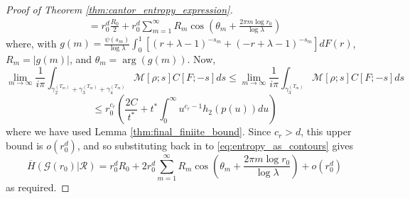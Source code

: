 \documentclass{article}
\newcommand{\tti}{\rightarrow\infty}
\newcommand{\graph}{\mathcal{G}}
\begin{document}
\begin{proof}[Proof of Theorem \ref{thm:cantor_entropy_expression}]
\begin{align}
        = r_0^d \frac{R_0}{2} + r_0^d\sum_{m=1}^{\infty} R_m\cos\left(\theta_m + \frac{2\pi m \log r_0}{\log \lambda}\right)
    \end{align}
    where, with $g(m) = \frac{\psi(s_m)}{\log \lambda}\int_0^1\left[(r+\lambda-1)^{-s_m}+(-r+\lambda-1)^{-s_m}\right]dF(r)$, $R_m = |g(m)|$, and $\theta_m = \arg(g(m))$. Now, 
    \begin{equation}
        \lim_{m\tti} \frac{1}{i\pi}\int_{\gamma_2^{(T_m)}+\gamma_3^{(T_m)}+\gamma_4^{(T_m)}} \mathcal{M}[\rho; s]C[F;-s]ds \leq \lim_{m\tti} \frac{1}{i\pi}\int_{\gamma_3^{(T_m)}} \mathcal{M}[\rho; s]C[F;-s]ds
    \end{equation}
    \begin{equation}
        \leq r_0^{c_r}\left(\frac{2C}{t^*} + t^*\int_0^{\infty}u^{c_r-1}h_2(p(u))du\right)
    \end{equation}
    where we have used Lemma \ref{thm:final_finiite_bound}. Since $c_r >d$, this upper bound is $o(r_0^d)$, and so substituting back in to \eqref{eq:entropy_as_contours} gives
    \begin{equation}
        \overline{H}(\graph(r_0)|\mathcal{R}) = r_0^dR_0 + 2r_0^d \sum_{m=1}^\infty R_m \cos \left(\theta_m + \frac{2\pi m \log r_0}{\log \lambda}\right) + o(r_0^d)
    \end{equation}
    as required.
\end{proof}


\printbibliography
\end{document}
